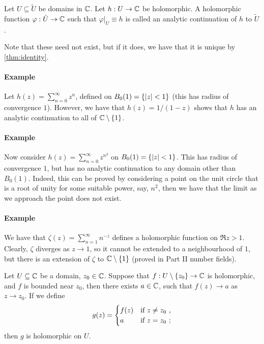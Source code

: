 \begin{definition}
  Let $U \subseteq \tilde{U}$ be domains in $\mathbb{C}$.
Let $h : U \rightarrow \mathbb{C}$ be holomorphic.
A holomorphic function $\varphi : \tilde{U} \rightarrow \mathbb{C}$ such that $\varphi\rvert_U \equiv h$ is called an analytic continuation of $h$ to $\tilde{U}$.
\end{definition}

Note that these need not exist, but if it does, we have that it is unique by \cref{thm:identity}.

\paragraph{Example}
Let $h(z) = \sum_{n=0}^\infty z^n$, defined on $B_0(1) = \{ \lvert z\rvert < 1 \}$ (this has radius of convergence $1$). However, we have that $h(z) = 1/(1-z)$ shows that $h$ has an analytic continuation to all of $\mathbb{C} \setminus \{ 1 \}$.

\paragraph{Example}
Now consider $h(z) = \sum_{n=0}^\infty z^{n^2}$ on $B_0(1) =  \{ \lvert z\rvert < 1 \}$. This has radius of convergence $1$, but has no analytic continuation to any domain other than $B_0(1)$.
Indeed, this can be proved by considering a point on the unit circle that is a root of unity for some suitable power, say, $n^2$, then we have that the limit as we approach the point does not exist.

\paragraph{Example}
We have that $\zeta(z) = \sum_{n=1}^\infty n^{-z}$ defines a holomorphic function on $\Re z > 1$.
Clearly, $\zeta$ diverges as $z \rightarrow 1$, so it cannot be extended to a neighbourhood of $1$, but there is an extension of $\zeta$ to $\mathbb{C} \setminus \{ 1 \}$ (proved in Part II number fields).


\begin{theorem}
Let $U \subseteq \mathbb{C}$ be a domain, $z_0 \in \mathbb{C}$.
Suppose that $f : U \setminus \{ z_0 \} \rightarrow \mathbb{C}$ is holomorphic, and $f$ is bounded near $z_0$, then there exists $a \in \mathbb{C}$, such that $f(z) \rightarrow a$ as $z \rightarrow z_0$.
If we define
\[
g(z) = \begin{cases}f(z) & \text{if } z \neq z_0 \ \text{,} \\ a & \text{if } z = z_0 \ \text{;} \end{cases}
\]
then $g$ is holomorphic on $U$.
\end{theorem}

